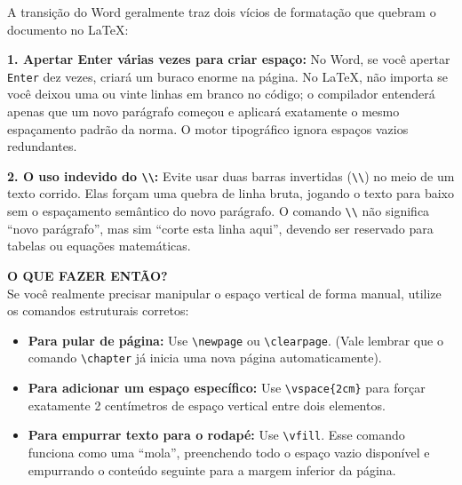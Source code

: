 \documentclass[12pt, a4paper]{article}
\begin{document}
\begin{itemize}
    \begin{atencao}
    A transição do Word geralmente traz dois vícios de formatação que quebram o documento no LaTeX:

    \textbf{1. Apertar Enter várias vezes para criar espaço:} No Word, se você apertar \texttt{Enter} dez vezes, criará um buraco enorme na página. No LaTeX, não importa se você deixou uma ou vinte linhas em branco no código; o compilador entenderá apenas que um novo parágrafo começou e aplicará exatamente o mesmo espaçamento padrão da norma. O motor tipográfico ignora espaços vazios redundantes.

    \textbf{2. O uso indevido do \texttt{\textbackslash\textbackslash}:} Evite usar duas barras invertidas (\texttt{\textbackslash\textbackslash}) no meio de um texto corrido. Elas forçam uma quebra de linha bruta, jogando o texto para baixo sem o espaçamento semântico do novo parágrafo. O comando \texttt{\textbackslash\textbackslash} não significa ``novo parágrafo'', mas sim ``corte esta linha aqui'', devendo ser reservado para tabelas ou equações matemáticas.

    \vspace{0.3cm}
    \textbf{O QUE FAZER ENTÃO?} \\
    Se você realmente precisar manipular o espaço vertical de forma manual, utilize os comandos estruturais corretos:
    \begin{itemize}
        \item \textbf{Para pular de página:} Use \texttt{\textbackslash newpage} ou \texttt{\textbackslash clearpage}. (Vale lembrar que o comando \texttt{\textbackslash chapter} já inicia uma nova página automaticamente).
        \item \textbf{Para adicionar um espaço específico:} Use \texttt{\textbackslash vspace\{2cm\}} para forçar exatamente 2 centímetros de espaço vertical entre dois elementos.
        \item \textbf{Para empurrar texto para o rodapé:} Use \texttt{\textbackslash vfill}. Esse comando funciona como uma ``mola'', preenchendo todo o espaço vazio disponível e empurrando o conteúdo seguinte para a margem inferior da página.
    \end{itemize}
    \end{atencao}


\end{itemize}
\end{document}
